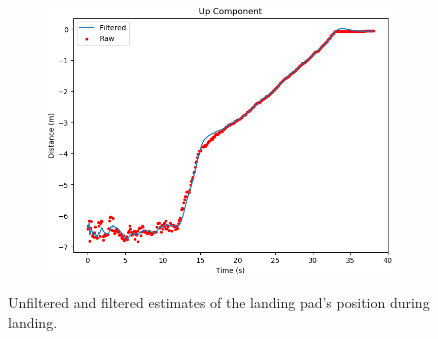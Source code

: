 \begin{figure}
    \begin{subfigure}[b]{0.49\textwidth}
         \centering
         \includegraphics[width=\textwidth]{images/landing_apriltag24h10_up}
    \end{subfigure}
    \caption{Unfiltered and filtered estimates of the landing pad's position during landing.}
    \label{figure:filtered_unfiltered_apriltag_24h10}
\end{figure}